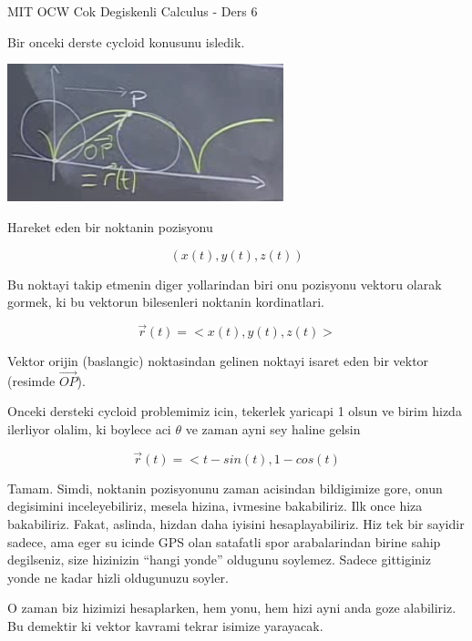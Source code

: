 \documentclass[12pt,fleqn]{article}
\begin{document}
MIT OCW Cok Degiskenli Calculus - Ders 6

Bir onceki derste cycloid konusunu isledik. 

\includegraphics[height=4cm]{6_1.png}

Hareket eden bir noktanin pozisyonu

\[ (x(t), y(t), z(t)) \]

Bu noktayi takip etmenin diger yollarindan biri onu pozisyonu vektoru
olarak gormek, ki bu vektorun bilesenleri noktanin kordinatlari. 

\[ \vec{r}(t) = <x(t),y(t),z(t)> \]

Vektor orijin (baslangic) noktasindan gelinen noktayi isaret eden bir
vektor (resimde $\vec{OP}$). 

Onceki dersteki cycloid problemimiz icin, tekerlek yaricapi 1 olsun ve
birim hizda ilerliyor olalim, ki boylece aci $\theta$ ve zaman ayni sey
haline gelsin

\[ \vec{r}(t) = <t-sin(t), 1-cos(t) \]

Tamam. Simdi, noktanin pozisyonunu zaman acisindan bildigimize gore, onun
degisimini inceleyebiliriz, mesela hizina, ivmesine bakabiliriz. Ilk once
hiza bakabiliriz. Fakat, aslinda, hizdan daha iyisini hesaplayabiliriz. Hiz
tek bir sayidir sadece, ama eger su icinde GPS olan satafatli spor
arabalarindan birine sahip degilseniz, size hizinizin ``hangi yonde''
oldugunu soylemez. Sadece gittiginiz yonde ne kadar hizli oldugunuzu
soyler. 

O zaman biz hizimizi hesaplarken, hem yonu, hem hizi ayni anda goze
alabiliriz. Bu demektir ki vektor kavrami tekrar isimize yarayacak. 
\end{document}
